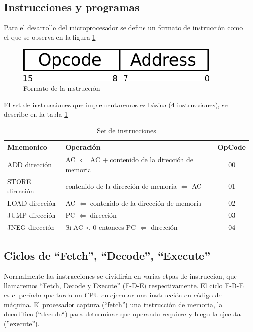 \subsection{Instrucciones y programas}
Para el desarrollo del microprocesador se define un formato de instrucción como el que se observa en 
la figura \ref{instruction}

\begin{figure}[h]
  \centering
    \includegraphics[width=.3\textwidth]{graficos/instruccion.png}
  \caption{Formato de la instrucción}
  \label{instruction}
\end{figure}

El set de instrucciones que implementaremos es básico (4 instrucciones), se describe en la tabla 
\ref{set_instruccion}

\begin{table}[!hbt] 
\centering
\begin{tabular}{|l|l|c|}
\hline
 \textbf{Mnemonico} & \textbf{Operación} & \textbf{OpCode}\\ \hline
ADD dirección & AC $\Leftarrow$ AC + contenido de la dirección de memoria & 00\\ \hline
STORE dirección& contenido de la dirección de memoria $\Leftarrow$ AC & 01\\ \hline
LOAD dirección& AC $\Leftarrow$ contenido de la dirección de memoria & 02\\ \hline
JUMP dirección& PC $\Leftarrow$ dirección & 03 \\ \hline
JNEG dirección& Si AC < 0 entonces PC $\Leftarrow$ dirección & 04 \\ \hline
\end{tabular}
  \caption{Set de instrucciones}
  \label{set_instruccion}
\end{table}

\subsection{Ciclos de ``Fetch'', ``Decode'', ``Execute''}
Normalmente las instrucciones se dividirán en varias etpas de instrucción, que llamaremos
``Fetch, Decode y Execute'' (F-D-E) respectivamente.
El ciclo F-D-E es el período que tarda un CPU en ejecutar una instrucción en código de máquina. 
El procesador captura (``fetch'') una instrucción de memoria, la decodifica (``decode``) 
para determinar que operando requiere y luego la ejecuta (''execute'').

